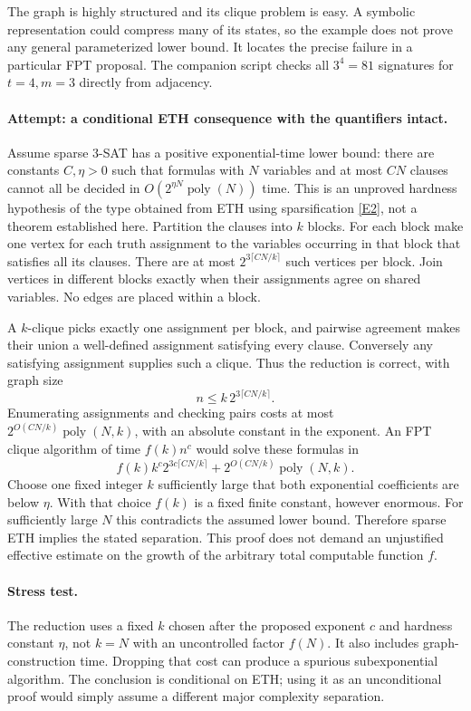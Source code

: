\documentclass[11pt,a4paper]{article}
\numberwithin{equation}{section}
\newcommand{\eref}[2]{\hyperlink{extra:#1:#2}{[E#2]}}
\begin{document}
The graph is highly structured and its clique problem is easy. A symbolic
representation could compress many of its states, so the example does
not prove any general parameterized lower bound. It locates the precise
failure in a particular FPT proposal. The companion script checks all
$3^4=81$ signatures for $t=4,m=3$ directly from adjacency.

\paragraph{Attempt: a conditional ETH consequence with the quantifiers intact.}
Assume sparse 3-SAT has a positive exponential-time lower bound: there are
constants $C,\eta>0$ such that formulas with $N$ variables and at most
$CN$ clauses cannot all be decided in $O(2^{\eta N}\operatorname{poly}(N))$
time. This is an unproved hardness hypothesis of the type obtained from
ETH using sparsification \eref{30006712}{2}, not a theorem established here.
Partition the clauses into $k$ blocks. For each block make one vertex for
each truth assignment to the variables occurring in that block that
satisfies all its clauses. There are at most
$2^{3\lceil CN/k\rceil}$ such vertices per block. Join vertices in
different blocks exactly when their assignments agree on shared variables.
No edges are placed within a block.

A $k$-clique picks exactly one assignment per block, and pairwise agreement
makes their union a well-defined assignment satisfying every clause.
Conversely any satisfying assignment supplies such a clique. Thus the
reduction is correct, with graph size
\[
 n\leq k\,2^{3\lceil CN/k\rceil}.
\]
Enumerating assignments and checking pairs costs at most
$2^{O(CN/k)}\operatorname{poly}(N,k)$, with an absolute constant in the
exponent. An FPT clique algorithm of time $f(k)n^c$ would solve these
formulas in
\[
 f(k)k^c2^{3c\lceil CN/k\rceil}
       +2^{O(CN/k)}\operatorname{poly}(N,k).
\]
Choose one fixed integer $k$ sufficiently large that both exponential
coefficients are below $\eta$. With that choice $f(k)$ is a fixed finite
constant, however enormous. For sufficiently large $N$ this contradicts
the assumed lower bound. Therefore sparse ETH implies the stated
separation. This proof does not demand an unjustified effective estimate
on the growth of the arbitrary total computable function $f$.

\paragraph{Stress test.}
The reduction uses a fixed $k$ chosen after the proposed exponent $c$ and
hardness constant $\eta$, not $k=N$ with an uncontrolled factor $f(N)$.
It also includes graph-construction time. Dropping that cost can produce
a spurious subexponential algorithm. The conclusion is conditional on ETH;
using it as an unconditional proof would simply assume a different major
complexity separation.
\end{document}
